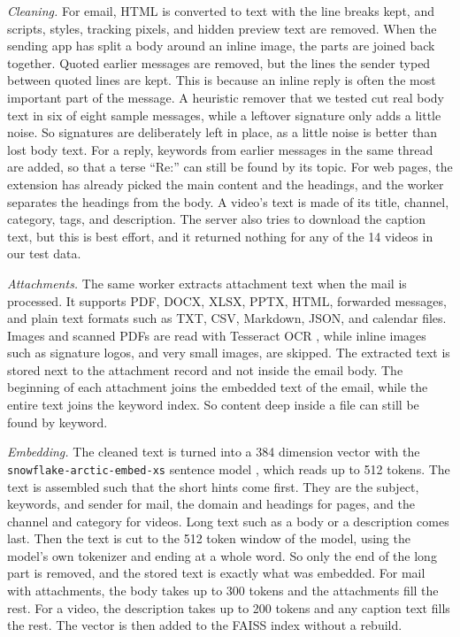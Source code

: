 \documentclass[conference]{IEEEtran}
\newcommand{\embmodel}{\texttt{snowflake\allowbreak-arctic\allowbreak-embed\allowbreak-xs}}
\newcommand{\embdim}{384}
\begin{document}
\textit{Cleaning.} For email, HTML is converted to text with the line breaks kept, and scripts, styles, tracking pixels, and hidden preview text are removed. When the sending app has split a body around an inline image, the parts are joined back together. Quoted earlier messages are removed, but the lines the sender typed between quoted lines are kept. This is because an inline reply is often the most important part of the message. A heuristic remover that we tested cut real body text in six of eight sample messages, while a leftover signature only adds a little noise. So signatures are deliberately left in place, as a little noise is better than lost body text. For a reply, keywords from earlier messages in the same thread are added, so that a terse ``Re:'' can still be found by its topic. For web pages, the extension has already picked the main content and the headings, and the worker separates the headings from the body. A video's text is made of its title, channel, category, tags, and description. The server also tries to download the caption text, but this is best effort, and it returned nothing for any of the 14 videos in our test data.

\textit{Attachments.} The same worker extracts attachment text when the mail is processed. It supports PDF, DOCX, XLSX, PPTX, HTML, forwarded messages, and plain text formats such as TXT, CSV, Markdown, JSON, and calendar files. Images and scanned PDFs are read with Tesseract OCR \cite{b15}, while inline images such as signature logos, and very small images, are skipped. The extracted text is stored next to the attachment record and not inside the email body. The beginning of each attachment joins the embedded text of the email, while the entire text joins the keyword index. So content deep inside a file can still be found by keyword.

\textit{Embedding.} The cleaned text is turned into a \embdim{} dimension vector with the \embmodel{} sentence model \cite{b16}, which reads up to 512 tokens. The text is assembled such that the short hints come first. They are the subject, keywords, and sender for mail, the domain and headings for pages, and the channel and category for videos. Long text such as a body or a description comes last. Then the text is cut to the 512 token window of the model, using the model's own tokenizer and ending at a whole word. So only the end of the long part is removed, and the stored text is exactly what was embedded. For mail with attachments, the body takes up to 300 tokens and the attachments fill the rest. For a video, the description takes up to 200 tokens and any caption text fills the rest. The vector is then added to the FAISS index without a rebuild.
\end{document}
